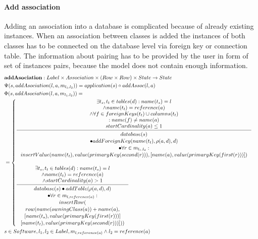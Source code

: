 \documentclass[11pt]{article}
\begin{document}
\paragraph{Add association} Adding an association into a database is complicated because of already existing instances. When an association between classes is added the instances of both classes has to be connected on the database level via foreign key or connection table. The information about pairing has to be provided by the user in form of set of instances pairs, because the model does not contain enough information. 
\begin{align*}
& \mathbf{addAsociation} : Label \times Association \times (Row \times Row) \times State \rightarrow State \\
& \Psi(s, addAsociation(l, a, m_{l_1, l_2})) = application(s) \circ addAssoc(l, a) \\
& \Phi(s, addAsociation(l, a, m_{l_1, l_2})) = \\
& =\begin{cases}
	\inference{ \exists t_s, t_t \in tables(d) : name(t_s) = l\\ 		\wedge name(t_t) = reference(a) \\ \wedge \forall f \in foreignKeys(t_t) \cup columns(t_t) \\: name(f) \neq name(a) \\ startCardinality(a) \leq 1}{\begin{gathered}
		database(s) \\ \bullet addForeignKey(name(t_t), \rho(a,d), d) \\ \bullet \forall r \in m_{l_1, l_2} : \\
		insertValue(name(t_t), value(primaryKey(second(r))), [name(a), value(primaryKey(first(r)))])
	\end{gathered}}
 \\ \\
	\inference{ \exists t_s, t_t \in tables(d) : name(t_s) = l \\ \wedge name(t_t) = reference(a) \\ \wedge startCardinality(a) > 1}{\begin{gathered} 
	database(s) \bullet addTable(\rho(a,d),d) \\ \bullet \forall r \in m_{l, reference(a)} :
	\\ insertRow(\\ row(name(owningClass(a)) + name(a), \\ [name(t_s), value(primaryKey(first(r)))]\\ [name(t_t), value(primaryKey(second(r)))]))
	\end{gathered}} 
\end{cases}\\
& s \in Software, l_1, l_2 \in Label, m_{l, reference(a)} \wedge l_2 = reference(a)
\end{align*}
\end{document}
